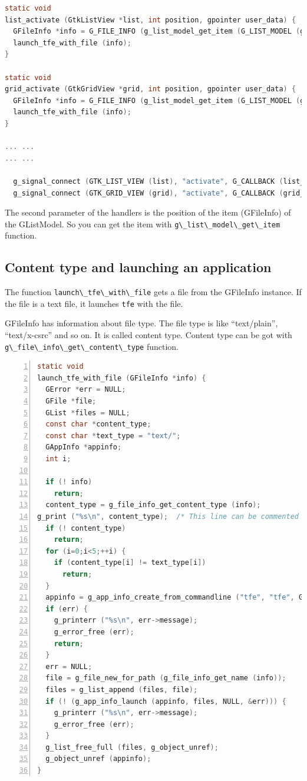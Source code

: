 \begin{lstlisting}[language=C]
static void
list_activate (GtkListView *list, int position, gpointer user_data) {
  GFileInfo *info = G_FILE_INFO (g_list_model_get_item (G_LIST_MODEL (gtk_list_view_get_model (list)), position));
  launch_tfe_with_file (info);
}

static void
grid_activate (GtkGridView *grid, int position, gpointer user_data) {
  GFileInfo *info = G_FILE_INFO (g_list_model_get_item (G_LIST_MODEL (gtk_grid_view_get_model (grid)), position));
  launch_tfe_with_file (info);
}

... ...
... ...

  g_signal_connect (GTK_LIST_VIEW (list), "activate", G_CALLBACK (list_activate), NULL);
  g_signal_connect (GTK_GRID_VIEW (grid), "activate", G_CALLBACK (grid_activate), NULL);
\end{lstlisting}

The second parameter of the handlers is the position of the item
(GFileInfo) of the GListModel. So you can get the item with
\passthrough{\lstinline!g\_list\_model\_get\_item!} function.

\hypertarget{content-type-and-launching-an-application}{%
\subsection{Content type and launching an
application}\label{content-type-and-launching-an-application}}

The function \passthrough{\lstinline!launch\_tfe\_with\_file!} gets a
file from the GFileInfo instance. If the file is a text file, it
launches \passthrough{\lstinline!tfe!} with the file.

GFileInfo has information about file type. The file type is like
``text/plain'', ``text/x-csrc'' and so on. It is called content type.
Content type can be got with
\passthrough{\lstinline!g\_file\_info\_get\_content\_type!} function.

\begin{lstlisting}[language=C, numbers=left]
static void
launch_tfe_with_file (GFileInfo *info) {
  GError *err = NULL;
  GFile *file;
  GList *files = NULL;
  const char *content_type;
  const char *text_type = "text/";
  GAppInfo *appinfo;
  int i;

  if (! info)
    return;
  content_type = g_file_info_get_content_type (info);
g_print ("%s\n", content_type);  /* This line can be commented out if unnecessary */
  if (! content_type)
    return;
  for (i=0;i<5;++i) {
    if (content_type[i] != text_type[i])
      return;
  }
  appinfo = g_app_info_create_from_commandline ("tfe", "tfe", G_APP_INFO_CREATE_NONE, &err);
  if (err) {
    g_printerr ("%s\n", err->message);
    g_error_free (err);
    return;
  }
  err = NULL;
  file = g_file_new_for_path (g_file_info_get_name (info));
  files = g_list_append (files, file);
  if (! (g_app_info_launch (appinfo, files, NULL, &err))) {
    g_printerr ("%s\n", err->message);
    g_error_free (err);
  }
  g_list_free_full (files, g_object_unref);
  g_object_unref (appinfo);
}
\end{lstlisting}

